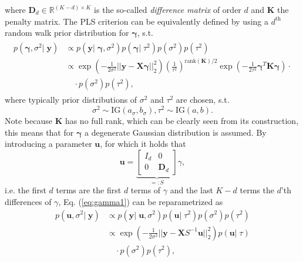 \documentclass[12pt,letterpaper]{article}
\numberwithin{equation}{subsection}
\begin{document}
where $\mathbf{D}_d \in \mathbb{R}^{(K-d) \times K}$ is the so-called \textit{difference matrix} of order $d$ and $\mathbf{K}$ the penalty matrix. The PLS criterion can be equivalently defined by using a $d^{\text{th}}$ random walk prior distribution for $\mathbf{\gamma}$, s.t. 
\begin{align}
\begin{split}
p(\mathbf{\gamma}, \sigma^2 | \; \mathbf{y}) & \propto  p(\mathbf{y} | \; \mathbf{\gamma}, \sigma^2) p(\mathbf{\gamma} | \; \tau^2) p(\sigma^2) p(\tau^2) \\
& \propto  \exp(-\frac{1}{2\sigma^2}||\mathbf{y} - \mathbf{X}\mathbf{\gamma}||^2_2)
(\frac{1}{\tau^2})^{\text{rank}(\mathbf{K})/2}\exp(-\frac{1}{2\tau^2}\mathbf{\gamma}^T\mathbf{K}\mathbf{\gamma}) \cdot \\
 &  \quad\cdot p(\sigma^2) p(\tau^2),
\end{split}
\label{eq:gamma1}
\end{align}
where typically prior distributions of $\sigma^2$ and $\tau^2$ are chosen, s.t. 
\begin{equation}
\sigma^2 \sim \text{IG}(a_\sigma, b_\sigma), \tau^2 \sim \text{IG}(a, b).
\end{equation}
Note because $\mathbf{K}$ has no full rank, which can be clearly seen from its construction, this means that for $\mathbf{\gamma}$ a degenerate Gaussian distribution is assumed. 
By introducing a parameter $\mathbf{u}$, for which it holds that \begin{equation}
\mathbf{u} = \underbrace{\begin{bmatrix}I_{d} & 0 \\ 0 &\mathbf{D}_d\end{bmatrix}}_{=:S}\gamma,
\label{eq:urp}
\end{equation} 
i.e. the first $d$ terms are the first $d$ terms of $\gamma$ and the last $K-d$ terms the $d$'th differences of $\gamma$, Eq. (\ref{eq:gamma1}) can be reparametrized as 
\begin{equation}
\begin{split}
p(\mathbf{u}, \sigma^2 | \; \mathbf{y}) & \propto  p(\mathbf{y} | \; \mathbf{u}, \sigma^2) p(\mathbf{u} | \; \tau^2) p(\sigma^2) p(\tau^2) \\
& \propto  \exp(-\frac{1}{2\sigma^2}||\mathbf{y} - \mathbf{X}S^{-1}\mathbf{u}||^2_2)
p(\mathbf{u}|\;\tau) \\
 &  \quad\cdot p(\sigma^2) p(\tau^2),
\end{split}
\end{equation}
\end{document}
